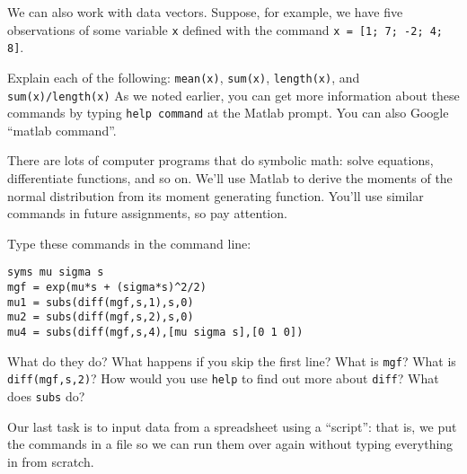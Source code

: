 \documentclass[11pt]{exam}
\begin{document}
\begin{questions}

We can also work with data vectors. 
Suppose, for example, we have five observations
of some variable {\tt x} defined with the command 
{\tt x = [1; 7; -2; 4; 8]}.  

Explain each of the following:
{\tt mean(x)}, 
{\tt sum(x)}, 
{\tt length(x)}, and 
{\tt sum(x)/length(x)} 
%
As we noted earlier, you can get more information about these commands by 
typing {\tt help command} at the Matlab prompt.  
You can also Google ``matlab command''.

There are lots of computer programs that do symbolic math:
solve equations, differentiate functions, and so on.
We'll use Matlab to derive the moments
of the normal distribution from its moment generating function.
You'll use similar commands in future assignments, so pay attention.

Type these commands in the command line:
%
\begin{verbatim}
syms mu sigma s
mgf = exp(mu*s + (sigma*s)^2/2)
mu1 = subs(diff(mgf,s,1),s,0)
mu2 = subs(diff(mgf,s,2),s,0)
mu4 = subs(diff(mgf,s,4),[mu sigma s],[0 1 0])
\end{verbatim}
%
What do they do?
What happens if you skip the first line?
What is {\tt mgf}?
What is {\tt diff(mgf,s,2)}?
How would you use {\tt help} to find out more about {\tt diff}?
What does {\tt subs} do?


Our last task is to input data from a spreadsheet
using a ``script'':
that is, we put the commands in a file so we can run them over again without typing
everything in from scratch.
\begin{parts}

\end{parts}
\end{questions}
\end{document}
